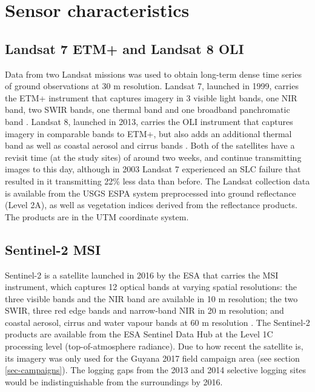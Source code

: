 \documentclass[a4paper,12pt]{scrbook}
\begin{document}
\section{Sensor characteristics}

\subsection{Landsat 7 ETM+ and Landsat 8 OLI}

Data from two Landsat missions was used to obtain long-term dense time series of ground observations at 30 m resolution. Landsat 7, launched in 1999, carries the \ac{ETM+} instrument that captures imagery in 3 visible light bands, one \ac{NIR} band, two \ac{SWIR} bands, one thermal band and one broadband panchromatic band \citep{u.s._geological_survey_product_2017_2}. Landsat 8, launched in 2013, carries the \ac{OLI} instrument that captures imagery in comparable bands to \ac{ETM+}, but also adds an additional thermal band as well as coastal aerosol and cirrus bands \citep{u.s._geological_survey_product_2017}. Both of the satellites have a revisit time (at the study sites) of around two weeks, and continue transmitting images to this day, although in 2003 Landsat 7 experienced an \ac{SLC} failure that resulted in it transmitting 22\% less data than before. The Landsat collection data is available from the \ac{USGS} \ac{ESPA} system preprocessed into ground reflectance (Level 2A), as well as vegetation indices derived from the reflectance products. The products are in the \ac{UTM} coordinate system.

\subsection{Sentinel-2 MSI}

Sentinel-2 is a satellite launched in 2016 by the \ac{ESA} that carries the \ac{MSI} instrument, which captures 12 optical bands at varying spatial resolutions: the three visible bands and the \ac{NIR} band are available in 10 m resolution; the two \ac{SWIR}, three red edge bands and narrow-band \ac{NIR} in 20 m resolution; and coastal aerosol, cirrus and water vapour bands at 60 m resolution \citep{suhet_sentinel-2_2015}. The Sentinel-2 products are available from the \ac{ESA} Sentinel Data Hub at the Level 1C processing level (top-of-atmosphere radiance). Due to how recent the satellite is, its imagery was only used for the Guyana 2017 field campaign area (see section \ref{sec-campaigns}). The logging gaps from the 2013 and 2014 selective logging sites would be indistinguishable from the surroundings by 2016.
\end{document}
